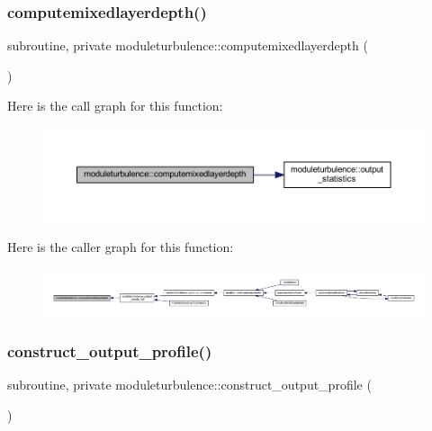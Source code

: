 \subsubsection{\texorpdfstring{computemixedlayerdepth()}{computemixedlayerdepth()}}
{\footnotesize\ttfamily subroutine, private moduleturbulence\+::computemixedlayerdepth (\begin{DoxyParamCaption}{ }\end{DoxyParamCaption})\hspace{0.3cm}{\ttfamily [private]}}

Here is the call graph for this function\+:\nopagebreak
\begin{figure}[H]
\begin{center}
\leavevmode
\includegraphics[width=350pt]{namespacemoduleturbulence_ad38c50749e5db481714069b7e366c4e7_cgraph}
\end{center}
\end{figure}
Here is the caller graph for this function\+:\nopagebreak
\begin{figure}[H]
\begin{center}
\leavevmode
\includegraphics[width=350pt]{namespacemoduleturbulence_ad38c50749e5db481714069b7e366c4e7_icgraph}
\end{center}
\end{figure}
\mbox{\label{namespacemoduleturbulence_a4e5f190dd7da54cb916c8956e331e54c}} 
\subsubsection{\texorpdfstring{construct\+\_\+output\+\_\+profile()}{construct\_output\_profile()}}
{\footnotesize\ttfamily subroutine, private moduleturbulence\+::construct\+\_\+output\+\_\+profile (\begin{DoxyParamCaption}{ }\end{DoxyParamCaption})\hspace{0.3cm}{\ttfamily [private]}}

